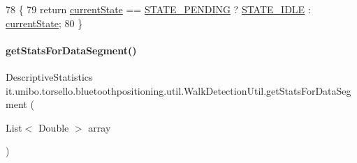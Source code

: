 \begin{DoxyCode}
78                           \{
79         \textcolor{keywordflow}{return} \hyperlink{classit_1_1unibo_1_1torsello_1_1bluetoothpositioning_1_1util_1_1WalkDetectionUtil_a6d087343f7fa10a9fb4f72bd81b4cde4_a6d087343f7fa10a9fb4f72bd81b4cde4}{currentState} == \hyperlink{classit_1_1unibo_1_1torsello_1_1bluetoothpositioning_1_1util_1_1WalkDetectionUtil_afbb85c995ea51422b96e79d754c68b2e_afbb85c995ea51422b96e79d754c68b2e}{STATE\_PENDING} ? 
      \hyperlink{classit_1_1unibo_1_1torsello_1_1bluetoothpositioning_1_1util_1_1WalkDetectionUtil_a37359c8b8bf98a1283c3c06f0b98264f_a37359c8b8bf98a1283c3c06f0b98264f}{STATE\_IDLE} : \hyperlink{classit_1_1unibo_1_1torsello_1_1bluetoothpositioning_1_1util_1_1WalkDetectionUtil_a6d087343f7fa10a9fb4f72bd81b4cde4_a6d087343f7fa10a9fb4f72bd81b4cde4}{currentState};
80     \}
\end{DoxyCode}
\hypertarget{classit_1_1unibo_1_1torsello_1_1bluetoothpositioning_1_1util_1_1WalkDetectionUtil_a2a153d4d32a5684f7be18d7ee88daacd_a2a153d4d32a5684f7be18d7ee88daacd}{}\label{classit_1_1unibo_1_1torsello_1_1bluetoothpositioning_1_1util_1_1WalkDetectionUtil_a2a153d4d32a5684f7be18d7ee88daacd_a2a153d4d32a5684f7be18d7ee88daacd} 
\paragraph{\texorpdfstring{get\+Stats\+For\+Data\+Segment()}{getStatsForDataSegment()}}
{\footnotesize\ttfamily Descriptive\+Statistics it.\+unibo.\+torsello.\+bluetoothpositioning.\+util.\+Walk\+Detection\+Util.\+get\+Stats\+For\+Data\+Segment (\begin{DoxyParamCaption}\item[{List$<$ Double $>$}]{array }\end{DoxyParamCaption})\hspace{0.3cm}{\ttfamily [private]}}



